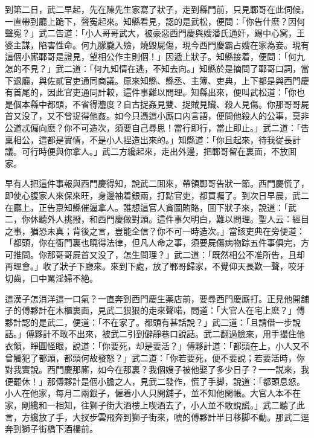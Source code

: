 到第二日，武二早起，先在陳先生家寫了狀子，走到縣門前，只見鄆哥在此伺候，一直帶到廳上跪下，聲寃起來。知縣看見，認的是武松，便問：「你告什麽？因何聲寃？」武二告道：「小人哥哥武大，被豪惡西門慶與嫂潘氏通奸，踢中心窝，王婆主謀，陷害性命。何九朦朧入殮，燒毀屍傷，現今西門慶霸占嫂在家為妾。現有這個小廝鄆哥是證見，望相公作主則個！」因遞上狀子。知縣接着，便問：「何九怎的不見？」武二道：「何九知情在逃，不知去向。」知縣於是摘問了鄆哥口詞，當下退廳，與佐貳官吏通同商議。原來知縣、縣丞、主簿、吏典，上下都是與西門慶有首尾的，因此官吏通同計較，這件事難以問理。知縣出來，便叫武松道：「你也是個本縣中都頭，不省得灋度？自古捉姦見雙、捉賊見贜、殺人見傷。你那哥哥屍首又没了，又不曾捉得他姦。如今只憑這小廝口内言語，便問他殺人的公事，莫非公道忒偏向麽？你不可造次，須要自己尋思！當行即行，當止即止。」武二道：「告稟相公，這都是實情，不是小人捏造出來的。」知縣道：「你且起來，待我従長計議。可行時便與你拿人。」武二方纔起來，走出外邊，把鄆哥留在裏面，不放囬家。

早有人把這件事報與西門慶得知，說武二囬來，帶領鄆哥告狀一節。西門慶慌了，即使心腹家人來保來旺，身邊袖着銀兩，打點官吏，都買囑了。到次日早晨，武二在廳上，正告禀知縣催逼拿人。誰想這官人貪圖賄賂，囬下狀子來，說道：「武二，你休聽外人挑撥，和西門慶做對頭。這件事欠明白，難以問理。聖人云：經目之事，猶恐未真；背後之言，豈能全信？你不可一時造次。」當該吏典在旁便道：「都頭，你在衙門裏也曉得法律，但凡人命之事，須要屍傷病物踪五件事俱完，方可推問。你那哥哥屍首又没了，怎生問理？」武二道：「既然相公不准所告，且却再理會。」收了狀子下廳來。來到下處，放了鄆哥歸家，不覺仰天長歎一聲，咬牙切齒，口中駡淫婦不絶。

這漢子怎消洋這一口氣？一直奔到西門慶生薬店前，要尋西門慶廝打。正見他開舖子的傅夥計在木櫃裏面，見武二狠狠的走來聲喏，問道：「大官人在宅上麽？」傅夥計認的是武二，便道：「不在家了。都頭有甚話說？」武二道：「且請借一步說話。」傅夥計不敢不出來，被武二引到僻靜巷口說話。武二翻過臉來，用手撮住他衣領，睜圓怪眼，說道：「你要死，却是要活？」傅夥計道：「都頭在上，小人又不曾觸犯了都頭，都頭何故發怒？」武二道：「你若要死，便不要說；若要活時，你對我實說。西門慶那廝，如今在那裏？我個嫂子被他娶了多少日子？一一説來，我便罷休！」那傅夥計是個小膽之人，見武二發作，慌了手脚，說道：「都頭息怒。小人在他家，每月二兩銀子，僱着小人只開舖子，並不知他閑帳。大官人本不在家，剛纔和一相知，往獅子街大酒樓上喫酒去了，小人並不敢說謊。」武二聽了此言，方纔放了手，大扠步雲飛奔到獅子街來，唬的傅夥計半日移脚不動。那武二逕奔到獅子街橋下酒樓前。

